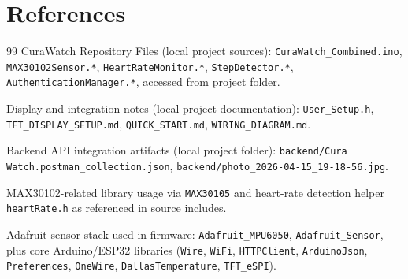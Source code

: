 \documentclass[12pt,a4paper]{report}
\begin{document}
\section*{References}
\begin{thebibliography}{99}
CuraWatch Repository Files (local project sources): \texttt{CuraWatch\_Combined.ino}, \texttt{MAX30102Sensor.*}, \texttt{HeartRateMonitor.*}, \texttt{StepDetector.*}, \texttt{AuthenticationManager.*}, accessed from project folder.

Display and integration notes (local project documentation): \texttt{User\_Setup.h}, \texttt{TFT\_DISPLAY\_SETUP.md}, \texttt{QUICK\_START.md}, \texttt{WIRING\_DIAGRAM.md}.

Backend API integration artifacts (local project folder): \texttt{backend/Cura Watch.postman\_collection.json}, \texttt{backend/photo\_2026-04-15\_19-18-56.jpg}.

MAX30102-related library usage via \texttt{MAX30105} and heart-rate detection helper \texttt{heartRate.h} as referenced in source includes.

Adafruit sensor stack used in firmware: \texttt{Adafruit\_MPU6050}, \texttt{Adafruit\_Sensor}, plus core Arduino/ESP32 libraries (\texttt{Wire}, \texttt{WiFi}, \texttt{HTTPClient}, \texttt{ArduinoJson}, \texttt{Preferences}, \texttt{OneWire}, \texttt{DallasTemperature}, \texttt{TFT\_eSPI}).
\end{thebibliography}
\end{document}

